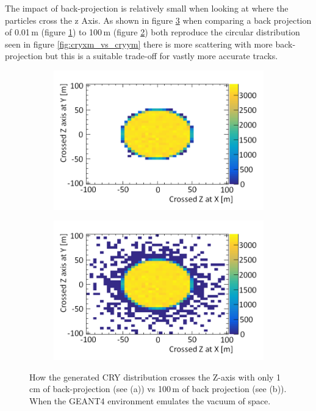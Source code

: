 The impact of back-projection is relatively small when looking at where the particles cross the z Axis. As shown in figure \ref{fig:Crossed_atZ_XY_AndShort} when comparing a back projection of 0.01\,m (figure \ref{subFig:CrossedZAxisShort}) to 100\,m (figure \ref{subFig:Crossed_atZ_XY}) both reproduce the circular distribution seen in figure \ref{fig:cryxm_vs_cryym} there is more scattering with more back-projection but this is a suitable trade-off for vastly more accurate tracks. 

\begin{figure}[!h]
\centering
\begin{subfigure}{.5\textwidth}
  \centering
  \includegraphics[width=\linewidth]{Chapter4/Figs/Raster/CryPlots/CrossedZAxisShortMedText.png}
  \captionsetup{width=.9\linewidth}
  \caption{}
  \label{subFig:CrossedZAxisShort}
\end{subfigure}%
\begin{subfigure}{.5\textwidth}
  \centering
  \includegraphics[width=\linewidth]{Chapter4/Figs/Raster/CryPlots/Crossed_atZ_XYMedText.png}
  \captionsetup{width=.9\linewidth}
  \caption{}
  \label{subFig:Crossed_atZ_XY}
\end{subfigure}
\caption{How the generated CRY distribution crosses the Z-axis with only 1\,cm of back-projection (see (a)) vs 100\,m of back projection (see (b)). When the GEANT4 environment emulates the vacuum of space.}
\label{fig:Crossed_atZ_XY_AndShort}
\end{figure}

